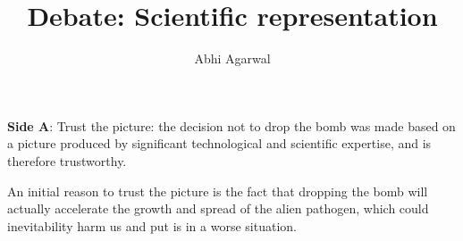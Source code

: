 \documentclass[11pt, oneside]{article}
\title{Debate: Scientific representation\vspace{-0.4cm}}
\author{Abhi Agarwal\vspace{-1cm}}
\date{}
\begin{document}
\maketitle

\noindent \textbf{Side A}: Trust the picture: the decision not to drop the bomb was made based on a picture produced by significant technological and scientific expertise, and is therefore trustworthy.




\par An initial reason to trust the picture is the fact that dropping the bomb will actually accelerate the growth and spread of the alien pathogen, which could inevitability harm us and put is in a worse situation.  

\end{document}
